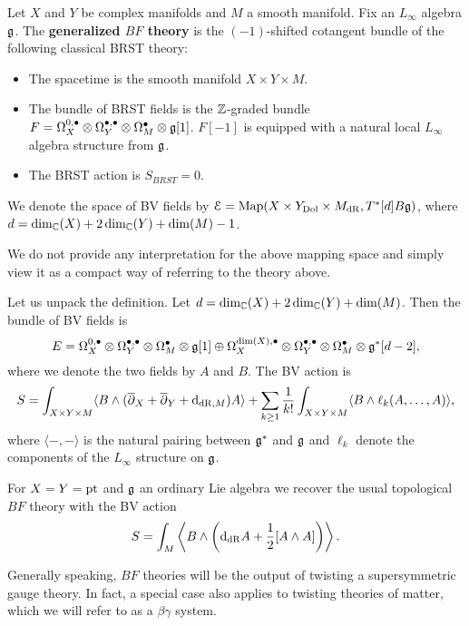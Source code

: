 \documentclass[10pt, oneside]{article}
\begin{document}
\begin{definition}
Let $X$ and $Y$ be complex manifolds and $M$ a smooth manifold. Fix an $L_\infty$ algebra $\mathfrak g$. The {\bf generalized $BF$ theory} is the $(-1)$-shifted cotangent bundle of the following classical BRST theory:
\begin{itemize}
\item The spacetime is the smooth manifold $X\times Y\times M$.

\item The bundle of BRST fields is the $\mathbb Z$-graded bundle $F = \Omega^{0,\bullet}_X \otimes \Omega^{\bullet,\bullet}_Y \otimes \Omega^\bullet_M \otimes \mathfrak g[1]$. $F[-1]$ is equipped with a natural local $L_\infty$ algebra structure from $\mathfrak g$.

\item The BRST action is $S_{BRST} = 0$.
\end{itemize}
We denote the space of BV fields by $\mathcal E = \operatorname{Map}(X\times Y_{\mathrm{Dol}}\times M_{\mathrm{dR}}, T^*[d] B\mathfrak g)$, where $d = \dim_\mathbb C(X) + 2\dim_\mathbb C(Y) + \dim(M) - 1$.
\label{def:generalizedBF}
\end{definition}

\begin{remark}
We do not provide any interpretation for the above mapping space and simply view it as a compact way of referring to the theory above.
\end{remark}

Let us unpack the definition. Let $d = \dim_\mathbb C(X) + 2\dim_\mathbb C(Y) + \dim(M)$. Then the bundle of BV fields is
\[E = \Omega^{0,\bullet}_X \otimes \Omega^{\bullet,\bullet}_Y \otimes \Omega^\bullet_M \otimes \mathfrak g[1]\oplus \Omega^{\dim(X),\bullet}_X \otimes \Omega^{\bullet,\bullet}_Y \otimes \Omega^\bullet_M\otimes \mathfrak g^*[d-2],\]
where we denote the two fields by $A$ and $B$. The BV action is
\[S = \int_{X\times Y\times M} \langle B\wedge (\overline{\partial}_X + \overline{\partial}_Y + {\rm d}_{\mathrm{dR}, M}) A\rangle + \sum_{k\geq 1}\frac{1}{k!} \int_{X\times Y\times M} \langle B\wedge \ell_k(A, \dots, A)\rangle,\]
where $\langle -, -\rangle$ is the natural pairing between $\mathfrak g^*$ and $\mathfrak g$ and $\ell_k$ denote the components of the $L_\infty$ structure on $\mathfrak g$.

\begin{example}
For $X=Y=\operatorname{pt}$ and $\mathfrak g$ an ordinary Lie algebra we recover the usual topological $BF$ theory with the BV action
\[S = \int_M \left\langle B\wedge \left({\rm d}_{\mathrm{dR}} A+ \frac{1}{2}[A\wedge A]\right)\right\rangle.\]
\end{example}

Generally speaking, $BF$ theories will be the output of twisting a supersymmetric gauge theory. 
In fact, a special case also applies to twisting theories of matter, which we will refer to as a $\beta\gamma$ system. 
\end{document}
